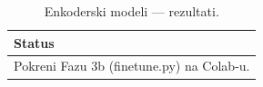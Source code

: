 \begin{table}[H]\centering
\caption{Enkoderski modeli --- rezultati.}\label{tab:encoder}
\begin{tabular}{l}
\toprule
Status \\
\midrule
Pokreni Fazu 3b (finetune.py) na Colab-u. \\
\bottomrule
\end{tabular}
\end{table}
